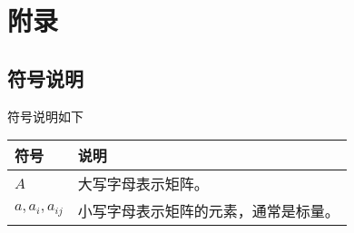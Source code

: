 \appendix

\chapter{附录}

\section{符号说明}

符号说明如下

\begin{table}[!hbt]
    \centering
    \begin{tabular}{p{2cm}p{8cm}}
        \toprule
        符号 & 说明 \\
        \midrule
        $A$ & 大写字母表示矩阵。 \\
        $a,a_i,a_{ij}$ & 小写字母表示矩阵的元素，通常是标量。 \\
        \bottomrule
    \end{tabular}
\end{table}
